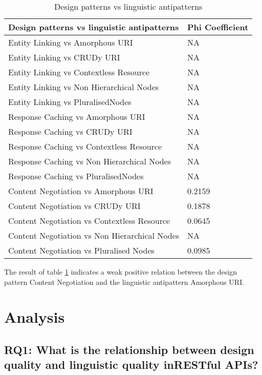 \documentclass[a4paper,12pt]{article}
\begin{document}
\begin{table}[hbt!]
    \centering
    \begin{tabular}{|p{90mm}|p{50mm}|}
\hline \textbf{Design patterns vs linguistic antipatterns} & \textbf{Phi Coefficient} 
\\ \hline 
Entity Linking vs Amorphous URI & NA
\\ \hline 
Entity Linking vs CRUDy URI & NA
\\ \hline 
Entity Linking vs Contextless Resource & NA
\\ \hline 
Entity Linking vs Non Hierarchical Nodes & NA
\\ \hline 
Entity Linking vs PluralisedNodes & NA
\\ \hline
Response Caching vs Amorphous URI & NA
\\ \hline 
Response Caching vs CRUDy URI & NA
\\ \hline 
Response Caching vs Contextless Resource & NA
\\ \hline 
Response Caching vs Non Hierarchical Nodes & NA
\\ \hline 
Response Caching vs PluralisedNodes & NA
\\ \hline
Content Negotiation vs Amorphous URI & 0.2159
\\ \hline 
Content Negotiation vs CRUDy URI & 0.1878
\\ \hline 
Content Negotiation vs Contextless Resource & 0.0645
\\ \hline 
Content Negotiation vs Non Hierarchical Nodes & NA
\\ \hline 
Content Negotiation vs Pluralised Nodes & 0.0985
\\ \hline 
    \end{tabular}
    \caption{Design patterns vs linguistic antipatterns}
    \label{tab:Design patterns vs linguistic antipatterns}
\end{table}

The result of table \ref{tab:Design patterns vs linguistic antipatterns} indicates a weak positive relation between the design pattern Content Negotiation and the linguistic antipattern Amorphous URI.

\clearpage

\newpage
	
\section{Analysis}

\subsection{RQ1: What is the relationship between design quality and linguistic quality inRESTful APIs?}
\end{document}
